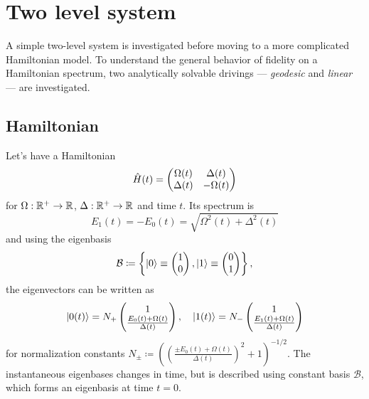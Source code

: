 \chapter{Two level system}
\label{chap:twoLevelSystem}
A simple two-level system is investigated before moving to a more complicated Hamiltonian model. To understand the general behavior of fidelity on a Hamiltonian spectrum, two analytically solvable drivings — \emph{geodesic} and \emph{linear} — are investigated.

\section{Hamiltonian}
Let's have a Hamiltonian
\begin{equation}
    \hat{H}(t)=\begin{pmatrix}
        \Omega(t)&\Delta(t)\\
        \Delta(t)&-\Omega(t)
    \end{pmatrix}
\end{equation}
for $\Omega: \mathbb{R}^+\rightarrow \mathbb{R}$, $\Delta: \mathbb{R}^+\rightarrow \mathbb{R}$ and time $t$. Its spectrum is
\begin{equation}
    E_1(t)=-E_0(t)= \sqrt{\Omega^2(t)+\Delta^2(t)}
    \label{eq:energy}
\end{equation}
and using the eigenbasis
\begin{equation}
    \mathcal{B}\coloneqq \left\{
        \ket{0}\equiv\begin{pmatrix}
                1\\0
            \end{pmatrix},
        \ket{1}\equiv\begin{pmatrix}
            0\\1
        \end{pmatrix} \right\},
    \label{eq:eigenbasisDef}
\end{equation}
the eigenvectors  can be written as 
\begin{equation}
\ket{0(t)}=N_+ \begin{pmatrix}
    1\\ \frac{E_0(t)+\Omega(t)}{\Delta(t)}
\end{pmatrix},\quad \ket{1(t)}=N_-\begin{pmatrix}
    1\\ \frac{E_1(t)+\Omega(t)}{\Delta(t)}
   \end{pmatrix}
   \label{eq:eigenvectors}
\end{equation}
for normalization constants $N_\pm\coloneqq\left(\left(\frac{\pm E_0(t)+\Omega(t)}{\Delta(t)}\right)^2+1\right)^{-1/2}$. The instantaneous eigenbases changes in time, but is described using constant basis $\mathcal B$, which forms an eigenbasis at time $t=0$.

